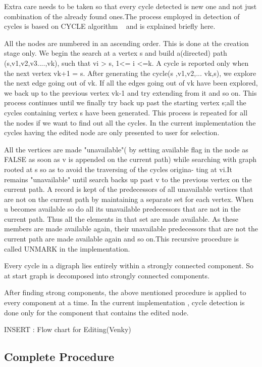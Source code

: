 		Extra care needs to be taken so that every cycle detected is new one and
	not just combination of the already found ones.The process employed in
	detection of cycles is based on CYCLE algorithm ~\cite{Rein} and 
	is explained briefly here.


	All the nodes are numbered in an ascending order. This is done at the
	creation stage only. We begin the search at a vertex s and build a(directed)
	path (s,v1,v2,v3....,vk), such that vi > s, 1<= i <=k. A cycle is reported
	only when the next vertex vk+1 = s. After generating the cycle(s ,v1,v2,...
	vk,s), we explore the next edge going out of vk. If all the edges going out
	of vk have been explored, we back up to the previous vertex vk-1 and try
	extending from it and so on. This process continues until we finally try
	back up past the starting vertex s;all the cycles containing vertex s have
	been generated. This process is repeated for all the nodes if we want to
	find out all the cycles. In the current implementation the cycles having
	the edited node are only presented to user for selection.

	All the vertices are made "unavailable"( by setting available flag in the
	node as FALSE as soon as v is appended on the current path) 
	while searching with graph
	rooted at s so as to avoid the traversing of the cycles origina-
	ting at vi.It remains "unavailable" until search backs up past v to the
	previous vertex on the current path. A record is kept of the predecessors
	of all unavailable vertices that are not on the current path by maintaining
	a separate set for each vertex. When u becomes available so do all its
	unavailable predecessors that are not in the current path. Thus all the
	elements in that set are made available. As these members are made 
	available again, their unavailable predecessors that are not the current 
	path are made available again and so on.This recursive procedure is called
	UNMARK in the implementation.


    Every cycle in a digraph lies entirely within a strongly connected
    component. So at start graph is decomposed into strongly connected
    components.


	After finding strong components, the above mentioned procedure is applied
	to every component at a time. In the current implementation , cycle
	detection is done only for the component that contains the edited node.


	INSERT : Flow chart for Editing(Venky)


	\subsection{Complete Procedure}

